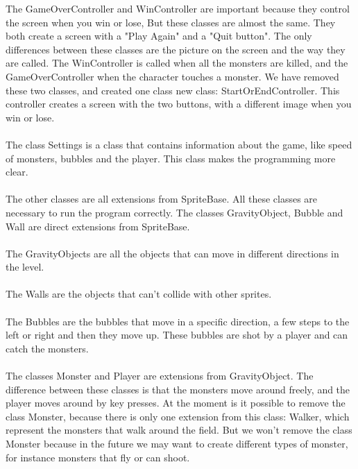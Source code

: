\noindent The GameOverController and WinController are important because they control the screen when you win or lose, But these classes are almost the same. They both create a screen with a "Play Again" and a "Quit button". The only differences between these classes are the picture on the screen and the way they are called. The WinController is called when all the monsters are killed, and the GameOverController when the character touches a monster. We have removed these two classes, and created one class new class: StartOrEndController. This controller creates a screen with the two buttons, with a different image when you win or lose.\\
\\
The class Settings is a class that contains information about the game, like speed of monsters, bubbles and the player. This class makes the programming more clear.\\
\\
The other classes are all extensions from SpriteBase. All these classes are necessary to run the program correctly. The classes GravityObject, Bubble and Wall are direct extensions from SpriteBase.\\
\\
The GravityObjects are all the objects that can move in different directions in the level.\\
\\
The Walls are the objects that can't collide with other sprites.\\
\\
The Bubbles are the bubbles that move in a specific direction, a few steps to the left or right and then they move up. These bubbles are shot by a player and can catch the monsters.\\
\\
The classes Monster and Player are extensions from GravityObject. The difference between these classes is that the monsters move around freely, and the player moves around by key presses. At the moment is it possible to remove the class Monster, because there is only one extension from this class: Walker, which represent the monsters that walk around the field. But we won't remove the class Monster because in the future we may want to create different types of monster, for instance monsters that fly or can shoot.